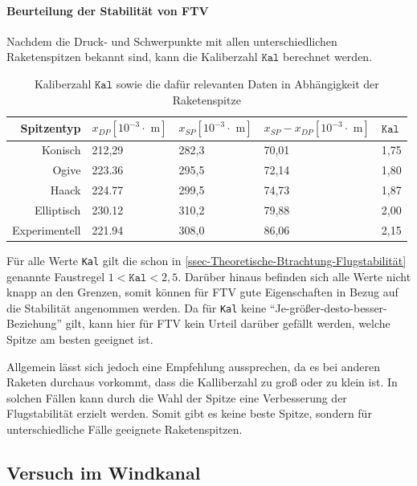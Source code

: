 \documentclass[10pt,a4paper]{article}
\begin{document}
\paragraph{Beurteilung der Stabilität von FTV}
Nachdem die Druck- und Schwerpunkte mit allen unterschiedlichen Raketenspitzen bekannt sind, kann die Kaliberzahl $\mathtt{Kal}$ berechnet werden.

\begin{table}[H]
	\caption{Kaliberzahl $\mathtt{Kal}$ sowie die dafür relevanten Daten in Abhängigkeit der Raketenspitze}
	\label{tab-Kaliberzahlen}
	\centering
	\begin{tabular}{r|lll|l}
		\toprule
		Spitzentyp	& $x_{DP} [10^{-3} \cdot \text{ m}]$ & $x_{SP} [10^{-3} \cdot \text{ m}]$ & $x_{SP} - x_{DP} [10^{-3} \cdot \text{ m}]$ & $\mathtt{Kal}$ \\
		\midrule
		Konisch			& 212,29  & 282,3  & 70,01 &  1,75 \\
		Ogive			& 223.36  & 295,5  & 72,14 &  1,80 \\
		Haack			& 224.77  & 299,5  & 74,73 &  1,87 \\
		Elliptisch		& 230.12  & 310,2  & 79,88 &  2,00 \\
		Experimentell	& 221.94  & 308,0  & 86,06 &  2,15 \\
		\bottomrule
	\end{tabular}
\end{table}

\noindent
Für alle Werte \texttt{Kal} gilt die schon in \ref{ssec-Theoretische-Btrachtung-Flugstabilität} genannte Faustregel $1 < \mathtt{Kal} < 2,5$. Darüber hinaus befinden sich alle Werte nicht knapp an den Grenzen, somit können für FTV gute Eigenschaften in Bezug auf die Stabilität angenommen werden. Da für \texttt{Kal} keine "`Je-größer-desto-besser-Beziehung"' gilt, kann hier für FTV kein Urteil darüber gefällt werden, welche Spitze am besten geeignet ist.

Allgemein lässt sich jedoch eine Empfehlung aussprechen, da es bei anderen Raketen durchaus vorkommt, dass die Kalliberzahl zu groß oder zu klein ist. In solchen Fällen kann durch die Wahl der Spitze eine Verbesserung der Flugstabilität erzielt werden. Somit gibt es keine beste Spitze, sondern für unterschiedliche Fälle geeignete Raketenspitzen. 


\subsection{Versuch im Windkanal}
\end{document}
